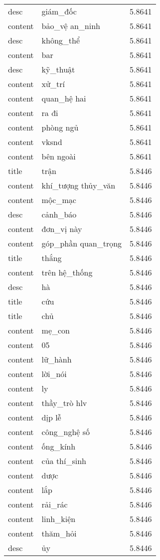 \documentclass{article}
\begin{document}
\begin{tabular}{lll}
desc & giám\_đốc & 5.8641\\
content & bảo\_vệ an\_ninh & 5.8641\\
desc & không\_thể & 5.8641\\
content & bar & 5.8641\\
desc & kỹ\_thuật & 5.8641\\
content & xử\_trí & 5.8641\\
content & quan\_hệ hai & 5.8641\\
content & ra đi & 5.8641\\
content & phòng ngủ & 5.8641\\
content & vksnd & 5.8641\\
content & bên ngoài & 5.8641\\
title & trận & 5.8446\\
content & khí\_tượng thủy\_văn & 5.8446\\
content & mộc\_mạc & 5.8446\\
desc & cảnh\_báo & 5.8446\\
content & đơn\_vị này & 5.8446\\
content & góp\_phần quan\_trọng & 5.8446\\
title & thắng & 5.8446\\
content & trên hệ\_thống & 5.8446\\
desc & hà & 5.8446\\
title & cứu & 5.8446\\
title & chủ & 5.8446\\
content & mẹ\_con & 5.8446\\
content & 05 & 5.8446\\
content & lữ\_hành & 5.8446\\
content & lời\_nói & 5.8446\\
content & ly & 5.8446\\
content & thầy\_trò hlv & 5.8446\\
content & dịp lễ & 5.8446\\
content & công\_nghệ số & 5.8446\\
content & ống\_kính & 5.8446\\
content & của thí\_sinh & 5.8446\\
content & dược & 5.8446\\
content & lắp & 5.8446\\
content & rải\_rác & 5.8446\\
content & linh\_kiện & 5.8446\\
content & thăm\_hỏi & 5.8446\\
desc & ủy & 5.8446\\

\end{tabular}
\end{document}
